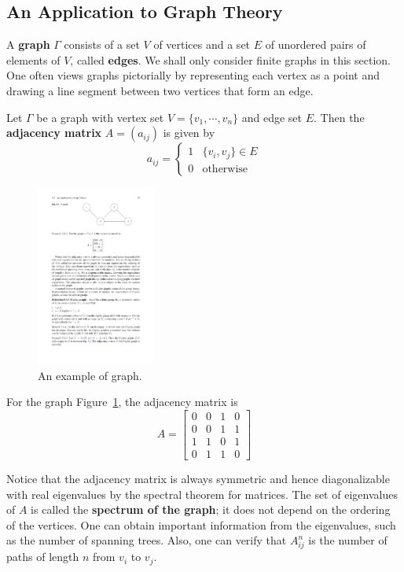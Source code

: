 \subsection{An Application to Graph Theory}
A \textbf{graph} $\Gamma$ consists of a set $V$ of vertices and a set $E$ of unordered pairs of elements of $V$, called \textbf{edges}. We shall only consider finite graphs in this section. One often views graphs pictorially by representing each vertex as a point and drawing a line segment between two vertices that form an edge.\par
\begin{definition}
Let $\Gamma$ be a graph with vertex set $V=\{v_1,\cdots,v_n\}$ and edge set $E$. Then the \textbf{adjacency matrix} $A=(a_{ij})$ is given by
\[a_{ij}=\begin{cases}
1&\{v_i,v_j\}\in E\\
0&\text{otherwise}
\end{cases}\]
\end{definition}
\begin{figure}[htbp]
\centering
\includegraphics[width=0.35\textwidth]{pictures/graph.pdf}
\caption{An example of graph.}
\label{graph eg}
\end{figure}
\begin{example}
For the graph Figure~\ref{graph eg}, the adjacency matrix is
\[A=\begin{bmatrix}
0&0&1&0\\
0&0&1&1\\
1&1&0&1\\
0&1&1&0
\end{bmatrix}\]
\end{example}
Notice that the adjacency matrix is always symmetric and hence diagonalizable
with real eigenvalues by the spectral theorem for matrices. The set of eigenvalues of $A$ is called the \textbf{spectrum of the graph}; it does not depend on the ordering of the vertices. One can obtain important information from the eigenvalues, such as the number of spanning trees. Also, one can verify that $A^n_{ij}$ is the number of paths of length $n$ from $v_i$ to $v_j$.\par 
